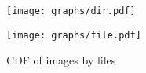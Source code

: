 \begin{figure}[t]
	\centering
	\begin{minipage}{0.26\textwidth}
		\centering
		\texttt{[image: graphs/dir.pdf]}
		\caption{CDF of images by\newline directories}
		\label{fig-dir}
	\end{minipage}%
	\begin{minipage}{0.24\textwidth}
		\centering
		\texttt{[image: graphs/file.pdf]}
		\caption{CDF of images by files}
		\label{fig-file}
	\end{minipage}
\end{figure}